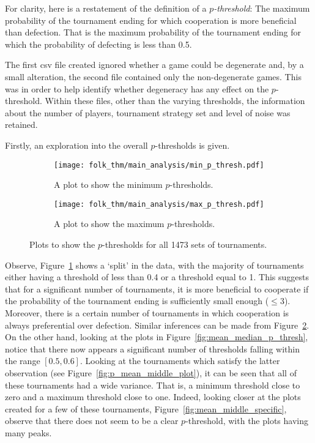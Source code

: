 For clarity, here is a restatement of the definition of a
\textit{\(p\)-threshold}: The maximum probability of the tournament ending for
which cooperation is more beneficial than defection. That is the maximum
probability of the tournament ending for which the probability of defecting is
less than 0.5.

The first csv file created ignored whether a game could be degenerate and, by a
small alteration, the second file contained only the non-degenerate games. This
was in order to help identify whether degeneracy has any effect on the
\(p\)-threshold. Within these files, other than the varying thresholds, the
information about the number of players, tournament strategy set and level of
noise was retained.

Firstly, an exploration into the overall \(p\)-thresholds is given.

\begin{figure}
    \begin{subfigure}{.45\textwidth}
        \centering
        \texttt{[image: folk\_thm/main\_analysis/min\_p\_thresh.pdf]}
        \caption{A plot to show the minimum \(p\)-thresholds.}\label{subfig:min_p_thresh}
    \end{subfigure}
    \begin{subfigure}{.45\textwidth}
        \centering
        \texttt{[image: folk\_thm/main\_analysis/max\_p\_thresh.pdf]}
        \caption{A plot to show the maximum \(p\)-thresholds.}\label{subfig:max_p_thresh}
    \end{subfigure}
    \caption{Plots to show the \(p\)-thresholds for all 1473 sets of tournaments.}\label{fig:min_max_p_thresh}
\end{figure}

Observe, Figure~\ref{subfig:min_p_thresh} shows a `split' in the data, with the
majority of tournaments either having a threshold of less than 0.4 or a
threshold equal to 1. This suggests that for a significant number of
tournaments, it is more beneficial to cooperate if the probability of the
tournament ending is sufficiently small enough (\(\le 3\)). Moreover, there is
a certain number of tournaments in which cooperation is always preferential
over defection. Similar inferences can be made from
Figure~\ref{subfig:max_p_thresh}. On the other hand, looking at the plots in
Figure~\ref{fig:mean_median_p_thresh}, notice that there now appears a
significant number of thresholds falling within the range \([0.5, 0.6]\).
Looking at the tournaments which satisfy the latter observation (see
Figure~\ref{fig:p_mean_middle_plot}), it can be seen that all of these
tournaments had a wide variance. That is, a minimum threshold close to zero and
a maximum threshold close to one. Indeed, looking closer at the plots created
for a few of these tournaments, Figure~\ref{fig:mean_middle_specific}, observe
that there does not seem to be a clear \(p\)-threshold, with the plots having
many peaks.  

